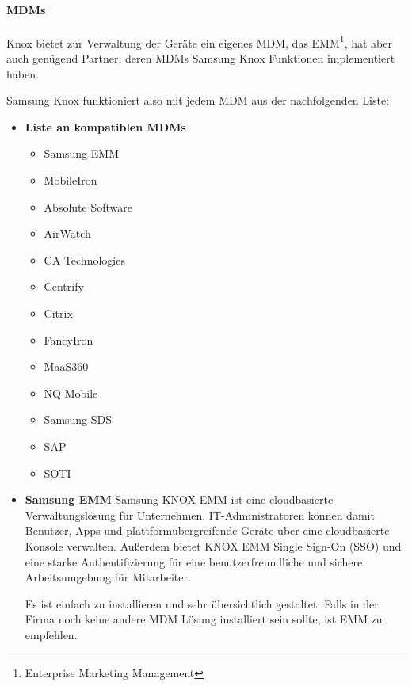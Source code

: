 \paragraph{MDMs}
Knox bietet zur Verwaltung der Geräte ein eigenes MDM, das EMM\footnote{Enterprise Marketing Management}, hat aber auch genügend Partner, deren MDMs Samsung Knox Funktionen implementiert haben. \par
Samsung Knox funktioniert also mit jedem MDM aus der nachfolgenden Liste:
\begin{itemize}
	\item \textbf{Liste an kompatiblen MDMs}
	\begin{itemize}
		\item Samsung EMM
		\item MobileIron
		\item Absolute Software
		\item AirWatch
		\item CA Technologies
		\item Centrify
		\item Citrix
		\item FancyIron
		\item MaaS360
		\item NQ Mobile
		\item Samsung SDS
		\item SAP
		\item SOTI
	\end{itemize}
	\item \textbf{Samsung EMM} \newline
	Samsung KNOX EMM ist eine cloudbasierte Verwaltungslösung für Unternehmen. IT-Administratoren können damit Benutzer, Apps und plattformübergreifende Geräte über eine cloudbasierte Konsole verwalten. Außerdem bietet KNOX EMM Single Sign-On (SSO) und eine starke Authentifizierung für eine benutzerfreundliche und sichere Arbeitsumgebung für Mitarbeiter. \par Es ist einfach zu installieren und sehr übersichtlich gestaltet. Falls in der Firma noch keine andere MDM Lösung installiert sein sollte, ist EMM zu empfehlen.
\end{itemize}




